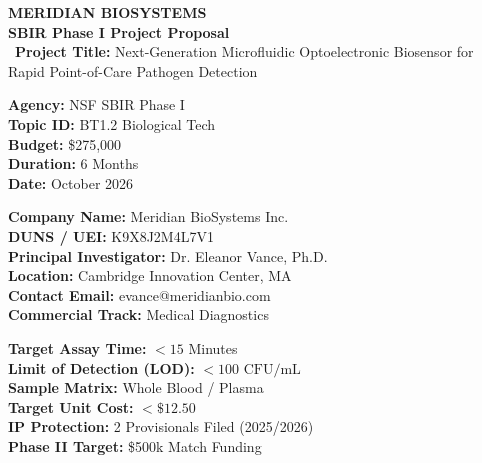 \documentclass[11pt,a4paper]{scrartcl}
\begin{document}
\begin{tcolorbox}[headerbox]
\begin{minipage}[t]{0.68\textwidth}
  {\selectfont\Huge\bfseries MERIDIAN BIOSYSTEMS}\\[2pt]
  {\Large\bfseries SBIR Phase I Project Proposal}\\[4pt]
  {\small\faMicrochip\ \textbf{Project Title:} Next-Generation Microfluidic Optoelectronic Biosensor for Rapid Point-of-Care Pathogen Detection}
\end{minipage}%
\hfill
\begin{minipage}[t]{0.28\textwidth}
  \raggedleft
  \small
  \textbf{Agency:} NSF SBIR Phase I\\
  \textbf{Topic ID:} BT1.2 Biological Tech\\
  \textbf{Budget:} \$275,000\\
  \textbf{Duration:} 6 Months\\
  \textbf{Date:} October 2026
\end{minipage}
\end{tcolorbox}

\vspace{-2pt}

\begin{minipage}[t]{0.48\textwidth}
  \begin{tcolorbox}[proposalcard, title={\small\bfseries\faBuilding\ Applicant Firm Details}, coltitle=NavyBlue, colbacktitle=LightGrayBG]
    \small
    \textbf{Company Name:} Meridian BioSystems Inc.\\
    \textbf{DUNS / UEI:} K9X8J2M4L7V1\\
    \textbf{Principal Investigator:} Dr. Eleanor Vance, Ph.D.\\
    \textbf{Location:} Cambridge Innovation Center, MA\\
    \textbf{Contact Email:} evance@meridianbio.com\\
    \textbf{Commercial Track:} Medical Diagnostics
  \end{tcolorbox}
\end{minipage}%
\hfill
\begin{minipage}[t]{0.48\textwidth}
  \begin{tcolorbox}[proposalcard, title={\small\bfseries\faBullseye\ Key Performance Metrics}, coltitle=NavyBlue, colbacktitle=LightGrayBG]
    \small
    \textbf{Target Assay Time:} $< 15$ Minutes\\
    \textbf{Limit of Detection (LOD):} $< 100\text{ CFU/mL}$\\
    \textbf{Sample Matrix:} Whole Blood / Plasma\\
    \textbf{Target Unit Cost:} $<\$12.50$\\
    \textbf{IP Protection:} 2 Provisionals Filed (2025/2026)\\
    \textbf{Phase II Target:} \$500k Match Funding
  \end{tcolorbox}
\end{minipage}
\end{document}
